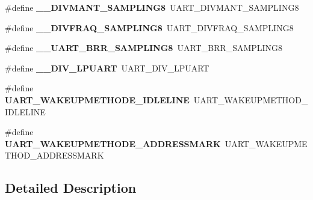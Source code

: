 \begin{DoxyCompactItemize}
\mbox{\label{group___h_a_l___u_a_r_t___aliased___defines_ga79e617709be4f56d9a327ca3a7dc316f}} 
\#define {\bfseries \+\_\+\+\_\+\+D\+I\+V\+M\+A\+N\+T\+\_\+\+S\+A\+M\+P\+L\+I\+N\+G8}~U\+A\+R\+T\+\_\+\+D\+I\+V\+M\+A\+N\+T\+\_\+\+S\+A\+M\+P\+L\+I\+N\+G8
\item 
\mbox{\label{group___h_a_l___u_a_r_t___aliased___defines_gac09eaea0db063364f5aac90f47791989}} 
\#define {\bfseries \+\_\+\+\_\+\+D\+I\+V\+F\+R\+A\+Q\+\_\+\+S\+A\+M\+P\+L\+I\+N\+G8}~U\+A\+R\+T\+\_\+\+D\+I\+V\+F\+R\+A\+Q\+\_\+\+S\+A\+M\+P\+L\+I\+N\+G8
\item 
\mbox{\label{group___h_a_l___u_a_r_t___aliased___defines_ga446f5df9b1c7c4f2bded186402dd4e62}} 
\#define {\bfseries \+\_\+\+\_\+\+U\+A\+R\+T\+\_\+\+B\+R\+R\+\_\+\+S\+A\+M\+P\+L\+I\+N\+G8}~U\+A\+R\+T\+\_\+\+B\+R\+R\+\_\+\+S\+A\+M\+P\+L\+I\+N\+G8
\item 
\mbox{\label{group___h_a_l___u_a_r_t___aliased___defines_gaa81cd3c42fac5a329fd499964658c20e}} 
\#define {\bfseries \+\_\+\+\_\+\+D\+I\+V\+\_\+\+L\+P\+U\+A\+RT}~U\+A\+R\+T\+\_\+\+D\+I\+V\+\_\+\+L\+P\+U\+A\+RT
\item 
\mbox{\label{group___h_a_l___u_a_r_t___aliased___defines_gab6e73a11dc29f715c2f3e48df9d9f30f}} 
\#define {\bfseries U\+A\+R\+T\+\_\+\+W\+A\+K\+E\+U\+P\+M\+E\+T\+H\+O\+D\+E\+\_\+\+I\+D\+L\+E\+L\+I\+NE}~U\+A\+R\+T\+\_\+\+W\+A\+K\+E\+U\+P\+M\+E\+T\+H\+O\+D\+\_\+\+I\+D\+L\+E\+L\+I\+NE
\item 
\mbox{\label{group___h_a_l___u_a_r_t___aliased___defines_ga0535d8a60a1563f7216a0f4b62a39c43}} 
\#define {\bfseries U\+A\+R\+T\+\_\+\+W\+A\+K\+E\+U\+P\+M\+E\+T\+H\+O\+D\+E\+\_\+\+A\+D\+D\+R\+E\+S\+S\+M\+A\+RK}~U\+A\+R\+T\+\_\+\+W\+A\+K\+E\+U\+P\+M\+E\+T\+H\+O\+D\+\_\+\+A\+D\+D\+R\+E\+S\+S\+M\+A\+RK
\end{DoxyCompactItemize}


\subsection{Detailed Description}

